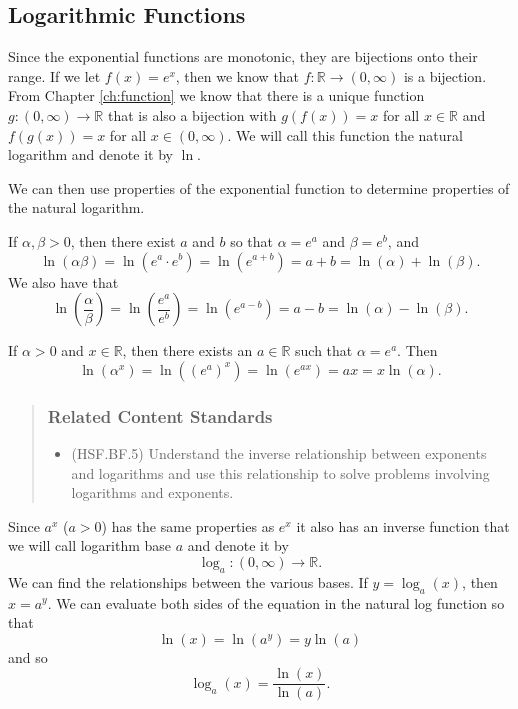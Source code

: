 \documentclass[
]{book}
\providecommand{\tightlist}{%
  \setlength{\itemsep}{0pt}\setlength{\parskip}{0pt}}
\theoremstyle{definition}
\theoremstyle{definition}
\theoremstyle{definition}
\theoremstyle{remark}
\begin{document}
\hypertarget{logarithmic-functions}{%
\subsection{Logarithmic Functions}\label{logarithmic-functions}}

Since the exponential functions are monotonic, they are bijections onto their range. If we let \(f(x)=e^x\), then we know that \(f:\mathbb{R} \rightarrow (0,\infty)\) is a bijection. From Chapter \ref{ch:function} we know that there is a unique function \(g:(0,\infty) \rightarrow \mathbb{R}\) that is also a bijection with \(g(f(x))=x\) for all \(x\in \mathbb{R}\) and \(f(g(x))=x\) for all \(x\in (0,\infty)\). We will call this function the natural logarithm and denote it by \(\ln\).

We can then use properties of the exponential function to determine properties of the natural logarithm.

If \(\alpha,\beta >0\), then there exist \(a\) and \(b\) so that \(\alpha = e^a\) and \(\beta = e^b\), and \[\ln (\alpha \beta) = \ln \left( e^a \cdot e^b\right) = \ln \left(e^{a+b}\right) = a+b = \ln (\alpha) + \ln (\beta). \] We also have that
\[\ln \left(\frac{\alpha}{\beta}\right) = \ln \left( \frac{e^a}{e^b} \right) = \ln \left( e^{a-b} \right) = a-b = \ln(\alpha) - \ln(\beta).\]

If \(\alpha>0\) and \(x\in \mathbb{R}\), then there exists an \(a\in \mathbb{R}\) such that \(\alpha=e^a\). Then
\[\ln \left(\alpha^x\right) = \ln \left( \left(e^a\right)^x\right) = \ln \left( e^{ax} \right) = ax = x \ln(\alpha).\]

\begin{quote}
\hypertarget{related-content-standards-44}{%
\subsubsection*{Related Content Standards}\label{related-content-standards-44}}

\begin{itemize}
\tightlist
\item
  (HSF.BF.5) Understand the inverse relationship between exponents and logarithms and use this relationship to solve problems involving logarithms and exponents.
\end{itemize}
\end{quote}

Since \(a^x\) (\(a>0\)) has the same properties as \(e^x\) it also has an inverse function that we will call logarithm base \(a\) and denote it by \[ \log_a: (0,\infty) \rightarrow \mathbb{R}.\] We can find the relationships between the various bases. If \(y= \log_a(x)\), then \(x=a^y\). We can evaluate both sides of the equation in the natural log function so that
\[\ln(x) = \ln\left(a^y\right) = y \ln (a)\] and so
\[\log_a(x) = \frac{\ln(x)}{\ln(a)}.\]
\end{document}
